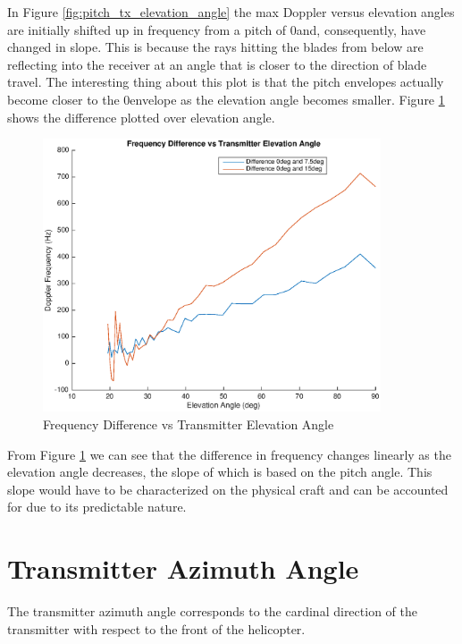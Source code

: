 In Figure \ref{fig:pitch_tx_elevation_angle} the max Doppler versus elevation angles are initially shifted up in frequency from a pitch of 0\textdegree \space and, consequently, have changed in slope. This is because the rays hitting the blades from below are reflecting into the receiver at an angle that is closer to the direction of blade travel. The interesting thing about this plot is that the pitch envelopes actually become closer to the 0\textdegree \space envelope as the elevation angle becomes smaller. Figure \ref{fig:pitch_tx_elevation_angle_difference} shows the difference plotted over elevation angle.

\begin{figure}
	\begin{center}
		\includegraphics[width=10cm]{images/simulation/elevation_angle_with_pitch_max_doppler_Difference.eps}
		\caption{Frequency Difference vs Transmitter Elevation Angle}
		\label{fig:pitch_tx_elevation_angle_difference}
	\end{center}
\end{figure}

From Figure \ref{fig:pitch_tx_elevation_angle_difference} we can see that the difference in frequency changes linearly as the elevation angle decreases, the slope of which is based on the pitch angle. This slope would have to be characterized on the physical craft and can be accounted for due to its predictable nature.

\section{Transmitter Azimuth Angle} \label{taa}
The transmitter azimuth angle corresponds to the cardinal direction of the transmitter with respect to the front of the helicopter.

